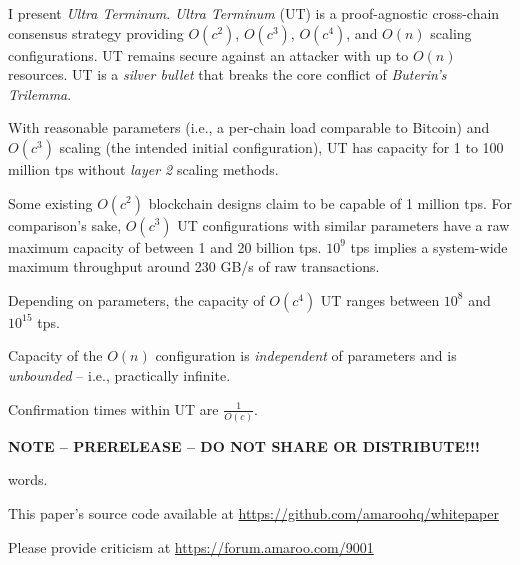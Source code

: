 
I present \emph{Ultra Terminum}. \emph{Ultra Terminum} (UT) is a proof-agnostic cross-chain consensus strategy providing $O(c^2)$, $O(c^3)$, $O(c^4)$, and $O(n)$ scaling configurations. UT remains secure against an attacker with up to $O(n)$ resources. UT is a \emph{silver bullet} that breaks the core conflict of \emph{Buterin's Trilemma}.

\par
With reasonable parameters (i.e., a per-chain load comparable to Bitcoin) and $O(c^3)$ scaling (the intended initial configuration), UT has capacity for 1 to 100 million tps without \emph{layer 2} scaling methods.
\par
Some existing $O(c^2)$ blockchain designs claim to be capable of 1 million tps. For comparison's sake, $O(c^3)$ UT configurations with similar parameters have a raw maximum capacity of between 1 and 20 billion tps. $10^9$ tps implies a system-wide maximum throughput around 230 GB/s of raw transactions.
\par
Depending on parameters, the capacity of $O(c^4)$ UT ranges between $10^8$ and $10^{15}$ tps.
\par
Capacity of the $O(n)$ configuration is \emph{independent} of parameters and is \emph{unbounded} -- i.e., practically infinite.
\par
Confirmation times within UT are $\frac{1}{O(c)}$.
\newline
\par
\textbf{NOTE -- PRERELEASE -- DO NOT SHARE OR DISTRIBUTE!!!}
\par
\wordcount words.
\par
This paper's source code available at \url{https://github.com/amaroohq/whitepaper}
\par
Please provide criticism at \url{https://forum.amaroo.com/9001}
